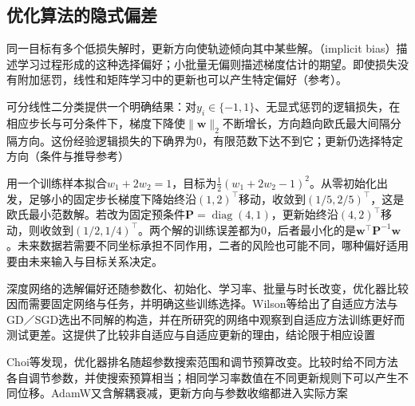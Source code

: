 \subsection{优化算法的隐式偏差}
\label{sec:generalization-implicit-bias}

同一目标有多个低损失解时，更新方向使轨迹倾向其中某些解。（implicit bias）描述学习过程形成的这种选择偏好；小批量无偏则描述梯度估计的期望。即使损失没有附加惩罚，线性和矩阵学习中的更新也可以产生特定偏好（参考）。

可分线性二分类提供一个明确结果：对$y_i\in\{-1,1\}$、无显式惩罚的逻辑损失，在相应步长与可分条件下，梯度下降使$\lVert\bm w\rVert_2$不断增长，方向趋向欧氏最大间隔分隔方向。这份经验逻辑损失的下确界为0，有限范数下达不到它；更新仍选择特定方向（条件与推导参考）

\begin{example}[改变更新几何会改变选出的解]
  \label{ex:generalization-update-geometry}
  用一个训练样本拟合$w_1+2w_2=1$，目标为$\tfrac12(w_1+2w_2-1)^2$。从零初始化出发，足够小的固定步长梯度下降始终沿$(1,2)^{\top}$移动，收敛到$(1/5,2/5)^{\top}$，这是欧氏最小范数解。若改为固定预条件$\bm P=\operatorname{diag}(4,1)$，更新始终沿$(4,2)^{\top}$移动，则收敛到$(1/2,1/4)^{\top}$。两个解的训练误差都为0，后者最小化的是$\bm w^{\top}\bm P^{-1}\bm w$。未来数据若需要不同坐标承担不同作用，二者的风险也可能不同，哪种偏好适用要由未来输入与目标关系决定。
\end{example}

深度网络的选解偏好还随参数化、初始化、学习率、批量与时长改变，优化器比较因而需要固定网络与任务，并明确这些训练选择。Wilson等给出了自适应方法与GD／SGD选出不同解的构造，并在所研究的网络中观察到自适应方法训练更好而测试更差。这提供了比较非自适应与自适应更新的理由，结论限于相应设置

Choi等发现，优化器排名随超参数搜索范围和调节预算改变。比较时给不同方法各自调节参数，并使搜索预算相当；相同学习率数值在不同更新规则下可以产生不同位移。AdamW又含解耦衰减，更新方向与参数收缩都进入实际方案

